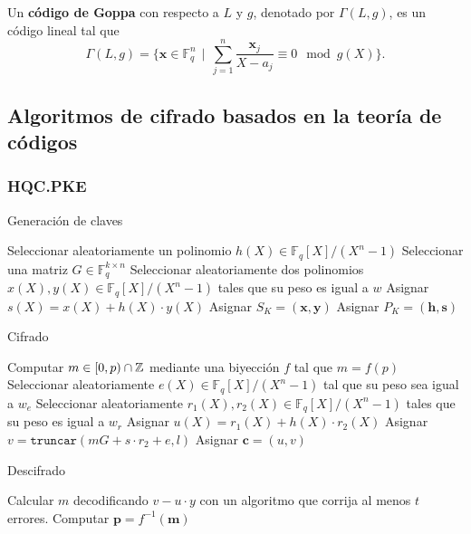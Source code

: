 \begin{definition}
	Un \textbf{código de Goppa} con respecto a $L$ y $g$, denotado por $\Gamma(L, g)$, es un código lineal tal que
	\[\Gamma(L, g) = \bigg\{\textbf{x} \in \mathbb{F}_q^n \ \ \bigg|\ \ \sum_{j=1}^n \frac{\textbf{x}_j}{X - a_j} \equiv 0 \mod g(X)\bigg\}.\]
\end{definition}

\subsection{Algoritmos de cifrado basados en la teoría de códigos}

\subsubsection{HQC.PKE}

\autocite{HQC}

\begin{algorithm}
	\caption{Generación de claves}\label{alg:1}
	Seleccionar aleatoriamente un polinomio $h(X) \in \mathbb{F}_q[X] / (X^n - 1)$\;
	Seleccionar una matriz $G \in \mathbb{F}_q^{k \times n}$\;
	Seleccionar aleatoriamente dos polinomios $x(X), y(X) \in \mathbb{F}_q[X] / (X^n - 1)$ tales que su peso es igual a $w$\;
	Asignar $s(X) = x(X) + h(X) \cdot y(X)$\;
	Asignar $S_K = (\textbf{x}, \textbf{y})$\;
	Asignar $P_K = (\textbf{h}, \textbf{s})$\;
\end{algorithm}

\begin{algorithm}
	\caption{Cifrado}\label{alg:1}
	Computar $m \in [0, p) \cap \mathbb{Z}$ mediante una biyección $f$ tal que $m = f(p)$\;
	Seleccionar aleatoriamente $e(X) \in \mathbb{F}_q[X] / (X^n - 1)$ tal que su peso sea igual a $w_e$\;
	Seleccionar aleatoriamente $r_1(X), r_2(X) \in \mathbb{F}_q[X] / (X^n - 1)$ tales que su peso es igual a $w_r$\;
	Asignar $u(X) = r_1(X) + h(X) \cdot r_2(X)$\;
	Asignar $v = \mathtt{truncar}(mG + s \cdot r_2 + e, l)$\;
	Asignar $\textbf{c} = (u, v)$\;
\end{algorithm}

\begin{algorithm}
	\caption{Descifrado}\label{alg:1}
	Calcular $m$ decodificando $v - u \cdot y$ con un algoritmo que corrija al menos $t$ errores.
	Computar $\textbf{p} = f^{-1}(\textbf{m})$\; 
\end{algorithm}

